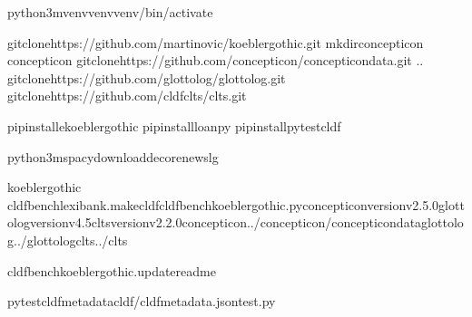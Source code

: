 \documentclass[letterpaper,10pt,english]{sphinxmanual}
\begin{document}
\begin{sphinxVerbatim}[commandchars=\\\{\}]
python3\PYGZhy{}mvenvvenvvenv/bin/activate

gitclonehttps://github.com/martino\PYGZhy{}vic/koeblergothic.git
mkdirconcepticon
concepticon
gitclonehttps://github.com/concepticon/concepticon\PYGZhy{}data.git
..
gitclonehttps://github.com/glottolog/glottolog.git
gitclonehttps://github.com/cldf\PYGZhy{}clts/clts.git

pipinstall\PYGZhy{}ekoeblergothic
pipinstallloanpy
pipinstallpytest\PYGZhy{}cldf

python3\PYGZhy{}mspacydownloadde\PYGZus{}core\PYGZus{}news\PYGZus{}lg

koeblergothic
cldfbenchlexibank.makecldfcldfbench\PYGZus{}koeblergothic.py\PYGZhy{}\PYGZhy{}concepticon\PYGZhy{}versionv2.5.0\PYGZhy{}\PYGZhy{}glottolog\PYGZhy{}versionv4.5\PYGZhy{}\PYGZhy{}clts\PYGZhy{}versionv2.2.0\PYGZhy{}\PYGZhy{}concepticon../concepticon/concepticon\PYGZhy{}data\PYGZhy{}\PYGZhy{}glottolog../glottolog\PYGZhy{}\PYGZhy{}clts../clts

cldfbenchkoeblergothic.update\PYGZus{}readme

pytest\PYGZhy{}\PYGZhy{}cldf\PYGZhy{}metadatacldf/cldf\PYGZhy{}metadata.jsontest.py
\end{sphinxVerbatim}

\sphinxstepscope
\end{document}
